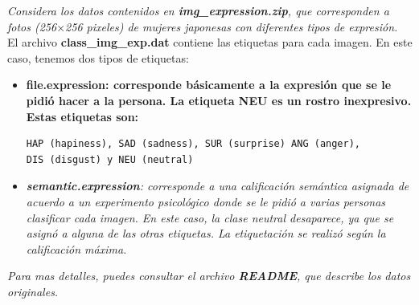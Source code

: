 \documentclass[paper=letter, fontsize=11pt]{scrartcl}
\numberwithin{equation}{section} %
\numberwithin{figure}{section} %
\numberwithin{table}{section} %
\begin{document}
\textit{Considera los datos contenidos en \textbf{img\_expression.zip}, que corresponden a fotos (256$\times$256 pixeles) de mujeres japonesas con diferentes tipos de expresión. }\\
El archivo \textbf{class\_img\_exp.dat} contiene las etiquetas para cada imagen. En este caso, tenemos dos tipos de etiquetas:
\begin{itemize}
\item \textbf{\textbf{file.expression}: corresponde básicamente a la expresión que se le pidió hacer a la persona. La etiqueta NEU es un rostro inexpresivo. Estas etiquetas son:
}\begin{verbatim}
HAP (hapiness), SAD (sadness), SUR (surprise) ANG (anger),
DIS (disgust) y NEU (neutral)
\end{verbatim}

\item \textit{\textbf{semantic.expression}: corresponde a una calificación semántica asignada de acuerdo a un experimento psicológico donde se le pidió a varias personas clasificar cada imagen. En este caso, la clase neutral desaparece, ya que se asignó a alguna de las otras etiquetas. La etiquetación se realizó según la calificación máxima.}

\end{itemize}
\textit{Para mas detalles, puedes consultar el archivo \textbf{README}, que describe los datos originales.}
\end{document}
